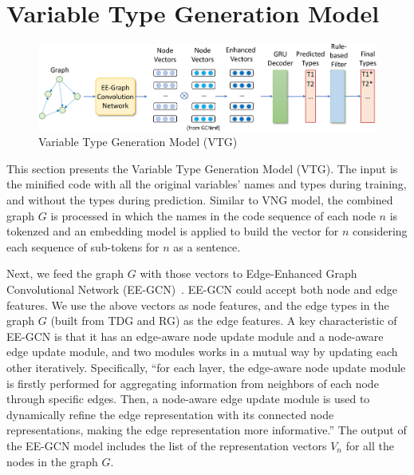 \section{Variable Type Generation Model}
\label{sec:type-gen}

\begin{figure}[ht]
	\begin{center}
	  \includegraphics[width=4.8in]{figures/type-gen-model-2}
          \vspace{-6pt}
		\caption{Variable Type Generation Model (VTG)}
		\label{fig:type-gen}
	\end{center}
\end{figure}

This section presents the Variable Type Generation Model (VTG).  The
input is the minified code with all the original variables' names and
types during training, and without the types during
prediction. Similar to VNG model, the combined graph $G$ is processed
in which the names in the code sequence of each node $n$ is tokenzed
and an embedding model is applied to build the vector for $n$
considering each sequence of sub-tokens for $n$ as a sentence.


Next, we feed the graph $G$ with those vectors to Edge-Enhanced Graph
Convolutional Network (EE-GCN)~\cite{ee-gcn}. EE-GCN could accept both
node and edge features.  We use the above vectors as node features,
and the edge types in the graph $G$ (built from TDG and RG) as
the edge features. A key characteristic of EE-GCN is that it has an
edge-aware node update module and a node-aware edge update module, and
two modules works in a mutual way by updating each other
iteratively. Specifically, ``for each layer, the edge-aware node
update module is firstly performed for aggregating information from
neighbors of each node through specific edges. Then, a node-aware edge
update module is used to dynamically refine the edge representation
with its connected node representations, making the edge
representation more informative.''  The output of the EE-GCN model
includes the list of the representation vectors $V_n$ for all the
nodes in the graph $G$.

